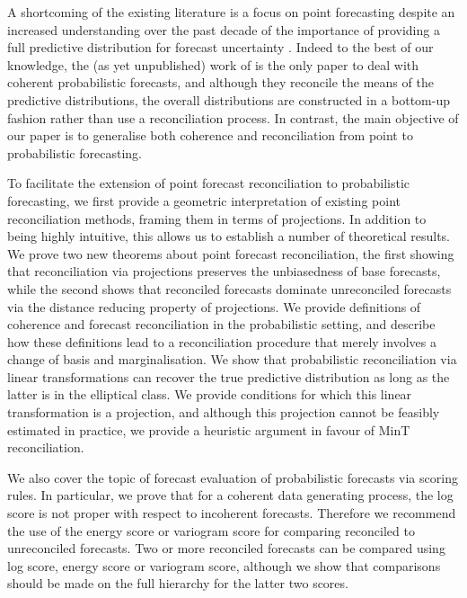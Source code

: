 \documentclass[12pt]{article}
\theoremstyle{definition}
\begin{document}
A shortcoming of the existing literature is a focus on point forecasting despite an increased understanding over the past decade of the importance of providing a full predictive distribution for forecast uncertainty \citep[see][and references therein]{Gneiting2014}. Indeed to the best of our knowledge, the (as yet unpublished) work of \citep{BenTaieb2017} is the only paper to deal with coherent probabilistic forecasts, and although they reconcile the means of the predictive distributions, the overall distributions are constructed in a bottom-up fashion rather than use a reconciliation process. In contrast, the main objective of our paper is to generalise both coherence and reconciliation from point to probabilistic forecasting.

To facilitate the extension of point forecast reconciliation to probabilistic forecasting, we first provide a geometric interpretation of existing point reconciliation methods, framing them in terms of projections. In addition to being highly intuitive, this allows us to establish a number of theoretical results. We prove two new theorems about point forecast reconciliation, the first showing that reconciliation via projections preserves the unbiasedness of base forecasts, while the second shows that reconciled forecasts dominate unreconciled forecasts via the distance reducing property of projections. We provide definitions of coherence and forecast reconciliation in the probabilistic setting, and describe how these definitions lead to a reconciliation procedure that merely involves a change of basis and marginalisation. We show that probabilistic reconciliation via linear transformations can recover the true predictive distribution as long as the latter is in the elliptical class. We provide conditions for which this linear transformation is a projection, and although this projection cannot be feasibly estimated in practice, we provide a heuristic argument in favour of MinT reconciliation.

We also cover the topic of forecast evaluation of probabilistic forecasts via scoring rules. In particular, we prove that for a coherent data generating process, the log score is not proper with respect to incoherent forecasts. Therefore we recommend the use of the energy score or variogram score for comparing reconciled to unreconciled forecasts. Two or more reconciled forecasts can be compared using log score, energy score or variogram score, although we show that comparisons should be made on the full hierarchy for the latter two scores.
\end{document}
